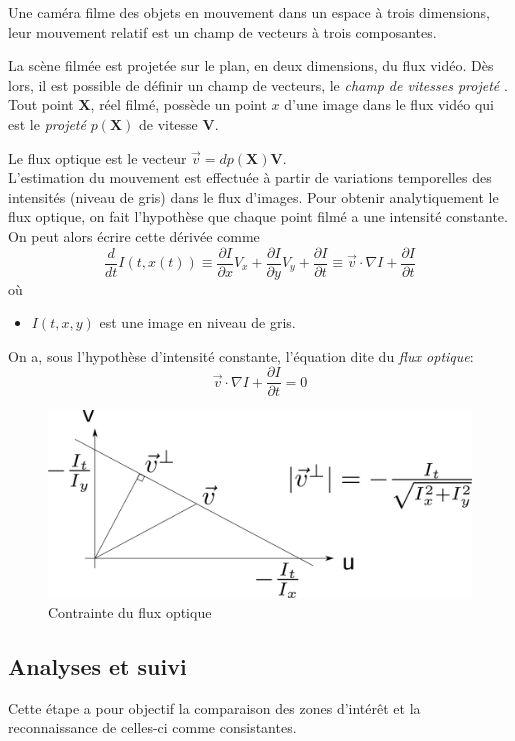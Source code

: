 \documentclass[a4paper,11pt]{report}
\begin{document}
Une caméra filme des objets en mouvement dans un espace à trois dimensions, leur mouvement relatif est un champ de vecteurs à trois composantes. 

La scène filmée est projetée sur le plan, en deux dimensions, du flux vidéo. Dès lors, il est possible de définir un champ de vecteurs, le \textit{champ de vitesses projeté} \cite{r}. \\

Tout point $\textbf{X}$, réel filmé, possède un point $x$ d'une image dans le flux vidéo qui est le \textit{projeté} $p(\textbf{X})$ de vitesse $\textbf{V}$. 

Le flux optique est le vecteur $\vec v = dp(\textbf{X})\textbf{V}$.\\
 
L'estimation du mouvement est effectuée à partir de variations temporelles des intensités (niveau de gris) dans le flux d'images. Pour obtenir analytiquement le flux optique, on fait l'hypothèse que chaque point filmé a une intensité constante. On peut alors écrire cette dérivée comme $$\frac{d}{dt}I(t,x(t)) \equiv \frac{\partial I}{\partial x}V_x+\frac{\partial I}{\partial y}V_y+\frac{\partial I}{\partial t} \equiv \vec v \cdot \nabla I + \frac{\partial I}{\partial t}$$
où 
\begin{itemize}
\item[] $I(t,x,y)$ est une image en niveau de gris.\\
\end{itemize}
On a, sous l'hypothèse d'intensité constante, l'équation dite du \textit{flux optique}:
$$\vec v \cdot \nabla I + \frac{\partial I}{\partial t} = 0 $$ 
\begin{figure}[hbtp]
\centering
\includegraphics[scale=0.4]{figureOpticalConstraint.png}
\caption{Contrainte du flux optique}
\end{figure}

\subsection{Analyses et suivi}
Cette étape a pour objectif la comparaison des zones d'intérêt et la reconnaissance de celles-ci comme consistantes.
\end{document}
